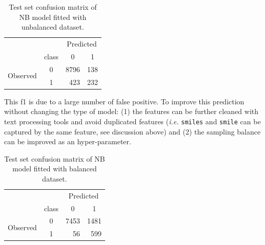 \documentclass[a4paper]{tufte-handout}
\begin{document}
\begin{fullwidth}
\begin{table}[]\label{NB1unbalanced}
\begin{center}
\begin{tabular}{llcr}
                                              &                            & \multicolumn{2}{c}{Predicted}                    \\
                                              & \multicolumn{1}{l|}{class} & 0                        & \multicolumn{1}{c}{1} \\ \cline{2-4} 
\multicolumn{1}{c}{\multirow{2}{*}{Observed}} & \multicolumn{1}{c|}{0}     & \multicolumn{1}{r}{8796} & 138                  \\
\multicolumn{1}{c}{}                          & \multicolumn{1}{c|}{1}     & \multicolumn{1}{r}{423  }   & 232                  
\end{tabular}
\caption{Test set confusion matrix of NB model fitted with unbalanced dataset.}
\end{center}
\end{table}

This f1 is due to a large number of false positive. To improve this prediction without changing the type of model: (1) the features can be further cleaned with text processing tools and avoid duplicated features (\textit{i.e.} \texttt{smiles} and \texttt{smile} can be captured by the same feature, see discussion above) and (2) the sampling balance can be improved as an hyper-parameter.

\begin{table}[]\label{NB1balanced}
\begin{center}
\begin{tabular}{llcr}
                                              &                            & \multicolumn{2}{c}{Predicted}                    \\
                                              & \multicolumn{1}{l|}{class} & 0                        & \multicolumn{1}{c}{1} \\ \cline{2-4} 
\multicolumn{1}{c}{\multirow{2}{*}{Observed}} & \multicolumn{1}{c|}{0}     & \multicolumn{1}{r}{7453} & 1481                  \\
\multicolumn{1}{c}{}                          & \multicolumn{1}{c|}{1}     & \multicolumn{1}{r}{56}   & 599                  
\end{tabular}
\caption{Test set confusion matrix of NB model fitted with balanced dataset.}
\end{center}
\end{table}


\end{fullwidth}
\end{document}
